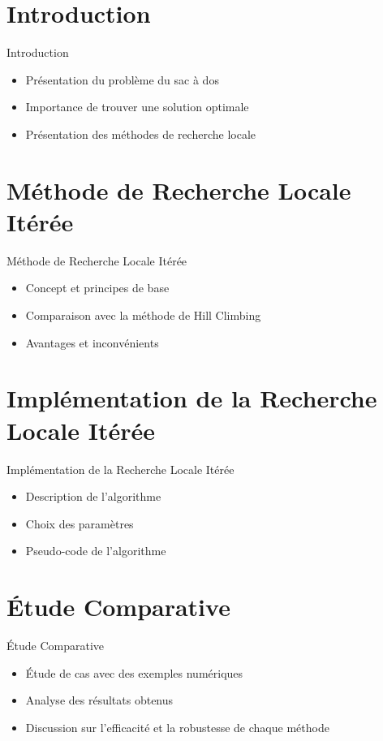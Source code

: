 \documentclass[11pt]{beamer}
\begin{document}
\section{Introduction}
\begin{frame}{Introduction}
    \begin{itemize}
        \item Présentation du problème du sac à dos
        \item Importance de trouver une solution optimale
        \item Présentation des méthodes de recherche locale
    \end{itemize}
\end{frame}

\section{Méthode de Recherche Locale Itérée}
\begin{frame}{Méthode de Recherche Locale Itérée}
    \begin{itemize}
        \item Concept et principes de base
        \item Comparaison avec la méthode de Hill Climbing
        \item Avantages et inconvénients
    \end{itemize}
\end{frame}

\section{Implémentation de la Recherche Locale Itérée}
\begin{frame}{Implémentation de la Recherche Locale Itérée}
    \begin{itemize}
        \item Description de l'algorithme
        \item Choix des paramètres
        \item Pseudo-code de l'algorithme
    \end{itemize}
\end{frame}

\section{Étude Comparative}
\begin{frame}{Étude Comparative}
    \begin{itemize}
        \item Étude de cas avec des exemples numériques
        \item Analyse des résultats obtenus
        \item Discussion sur l'efficacité et la robustesse de chaque méthode
    \end{itemize}
\end{frame}
\end{document}
